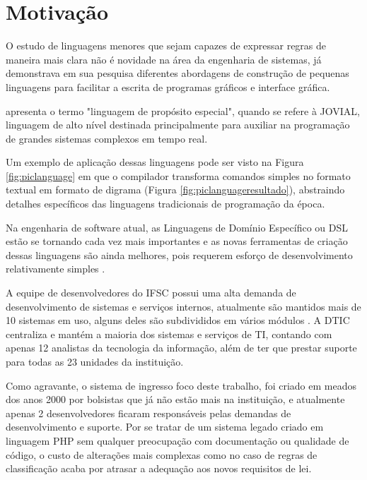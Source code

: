\section{Motivação}
\label{motivacao}

O estudo de linguagens menores que sejam capazes de expressar regras de maneira mais clara não é novidade na área da engenharia de sistemas,  já demonstrava em sua pesquisa diferentes abordagens de construção de pequenas linguagens para facilitar a escrita de programas gráficos e interface gráfica.


 apresenta o termo "linguagem de propósito especial", quando se refere à \gls{JOVIAL}, linguagem de alto nível destinada principalmente para auxiliar na programação de grandes sistemas complexos em tempo real. 

Um exemplo de aplicação dessas linguagens pode ser visto na Figura \ref{fig:piclanguage} em que o compilador transforma comandos simples no formato textual em formato de digrama (Figura \ref{fig:piclanguageresultado}), abstraindo detalhes específicos das linguagens tradicionais de programação da época.





Na engenharia de software atual, as Linguagens de Domínio Específico ou \gls{DSL} estão se tornando cada vez mais importantes e as novas ferramentas de criação dessas linguagens são ainda melhores, pois requerem esforço de desenvolvimento relativamente simples \cite{dslengineering}.


A equipe de desenvolvedores do \gls{IFSC} possui uma alta demanda de desenvolvimento de sistemas e serviços internos, atualmente são mantidos mais de 10 sistemas em uso, alguns deles são subdivididos em vários módulos \cite{catalogoifsc}. A \gls{DTIC} centraliza e mantém a maioria dos sistemas e serviços de TI, contando com apenas 12 analistas da tecnologia da informação, além de ter que prestar suporte para todas as 23 unidades da instituição. 

Como agravante, o sistema de ingresso foco deste trabalho, foi criado em meados dos anos 2000 por bolsistas que já não estão mais na instituição, e atualmente apenas 2 desenvolvedores ficaram responsáveis pelas demandas de desenvolvimento e suporte. Por se tratar de um sistema legado criado em linguagem PHP sem qualquer preocupação com documentação ou qualidade de código, o custo de alterações mais complexas como no caso de regras de classificação acaba por atrasar a adequação aos novos requisitos de lei. 

